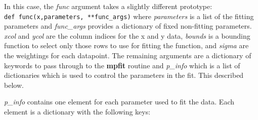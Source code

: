 \documentclass[a4paper,11pt]{scrartcl}
\begin{document}
In this case, the \textit{func} argument takes a slightly different
prototype:\\\verb:def func(x,parameters, **func_args): where \textit{parameters}
is a list of the fitting parameters and \textit{func\_args} provides a
dictionary of fixed \ie non-fitting parameters. \textit{xcol} and \textit{ycol}
are the column indices for the x and y data, \textit{bounds} is a bounding
function to select only those rows to use for fitting the function, and
\textit{sigma} are the weightings for each datapoint. The remaining arguments
are a dictionary of keywords to pass through to the \textbf{mpfit} routine and
\textit{p\_info} which is a list of dictionaries which is used to control the
parameters in the fit. This described below.

\textit{p\_info} contains one element for each parameter used to fit the data.
Each element is a dictionary with the following keys:
\end{document}
